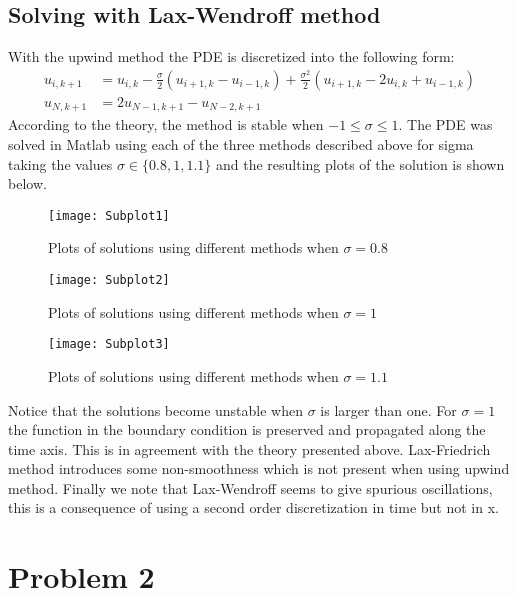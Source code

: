 \documentclass[11pt,a4paper,roman]{scrartcl}
\begin{document}
\subsection*{Solving with Lax-Wendroff method}
With the upwind method the PDE is discretized into the following form:
\begin{equation}
\begin{aligned}
u_{i,k+1} & = u_{i,k}-\frac{\sigma}{2}(u_{i+1,k}-u_{i-1,k})+\frac{\sigma^2}{2}(u_{i+1,k}-2u_{i,k}+u_{i-1,k}) \\
u_{N, k+1} & = 2u_{N-1, k+1} - u_{N-2, k+1}
\end{aligned}
\end{equation}
According to the theory, the method is stable when $-1\leq \sigma \leq 1$.
\newpage
The PDE was solved in Matlab using each of the three methods described above for sigma taking the values $\sigma\in\{0.8,1,1.1\}$ and the resulting plots of the solution is shown below.


\begin{figure}[!h]
\centering
\texttt{[image: Subplot1]}
\caption{Plots of solutions using different methods when $\sigma=0.8$}
\end{figure}

\begin{figure}[!h]
\centering
\texttt{[image: Subplot2]}
\caption{Plots of solutions using different methods when $\sigma=1$}
\end{figure}

\begin{figure}[!h]
\centering
\texttt{[image: Subplot3]}
\caption{Plots of solutions using different methods when $\sigma=1.1$}
\end{figure}
\FloatBarrier
Notice that the solutions become unstable when $\sigma$ is larger than one. For $\sigma=1$ the function in the boundary condition is preserved and propagated along the time axis. This is in agreement with the theory presented above. Lax-Friedrich method introduces some non-smoothness which is not present when using upwind method. Finally we note that Lax-Wendroff seems to give spurious oscillations, this is a consequence of using a second order discretization in time but not in x. 

\section*{Problem 2}
\end{document}

